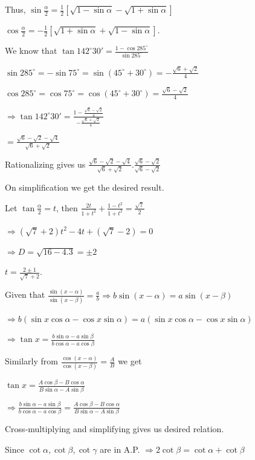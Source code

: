   Thus, $\sin\frac{\alpha}{2} = \frac{1}{2}\left[\sqrt{1 - \sin\alpha} - \sqrt{1 + \sin\alpha}\right]$

  $\cos\frac{\alpha}{2} = -\frac{1}{2}\left[\sqrt{1 + \sin\alpha} + \sqrt{1 - \sin\alpha}\right]$.
\item We know that $\tan142^\circ30' = \frac{1 - \cos285^\circ}{\sin285^\circ}$

  $\sin285^\circ = -\sin75^\circ = \sin\left(45^\circ + 30^\circ\right) = -\frac{\sqrt{6} + \sqrt{2}}{4}$

  $\cos285^\circ = \cos75^\circ = \cos\left(45^\circ + 30^\circ\right) = \frac{\sqrt{6} - \sqrt{2}}{4}$

  $\Rightarrow \tan142^\circ30' = \frac{1 - \frac{\sqrt{6} - \sqrt{2}}{4}}{-\frac{\sqrt{6} + \sqrt{2}}{4}}$

  $= \frac{\sqrt{6} - \sqrt{2} - \sqrt{4}}{\sqrt{6} + \sqrt{2}}$

  Rationalizing gives us $\frac{\sqrt{6} - \sqrt{2} - \sqrt{4}}{\sqrt{6} + \sqrt{2}}.\frac{\sqrt{6}
    - \sqrt{2}}{\sqrt{6} - \sqrt{2}}$

  On simplification we get the desired result.
\item Let $\tan\frac{\alpha}{2} = t$, then $\frac{2t}{1 + t^2} + \frac{1 - t^2}{1 + t^2}
  = \frac{\sqrt{7}}{2}$

  $\Rightarrow \left(\sqrt{7} + 2\right)t^2 - 4t + \left(\sqrt{7} - 2\right) = 0$

  $\Rightarrow D = \sqrt{16 - 4.3} = \pm2$

  $t = \frac{2\pm 1}{\sqrt{7} + 2}$.
\item Given that $\frac{\sin(x - \alpha)}{\sin(x - \beta)} = \frac{a}{b} \Rightarrow b\sin(x - \alpha) =
  a\sin(x - \beta)$

  $\Rightarrow b(\sin x\cos\alpha - \cos x\sin\alpha) = a(\sin x\cos\alpha - \cos x\sin\alpha)$

  $\Rightarrow \tan x = \frac{b\sin\alpha - a\sin\beta}{b\cos\alpha - a\cos\beta}$

  Similarly from $\frac{\cos(x - \alpha)}{\cos(x - \beta)} = \frac{A}{B}$ we get

  $\tan x = \frac{A\cos\beta - B\cos\alpha}{B\sin\alpha - A\sin\beta}$

  $\Rightarrow \frac{b\sin\alpha - a\sin\beta}{b\cos\alpha - a\cos\beta} = \frac{A\cos\beta -
    B\cos\alpha}{B\sin\alpha - A\sin\beta}$

  Cross-multiplying and simplifying gives us desired relation.
\item Since $\cot\alpha, \cot\beta, \cot\gamma$ are in A.P. $\Rightarrow 2\cot\beta = \cot\alpha
  + \cot\beta$


